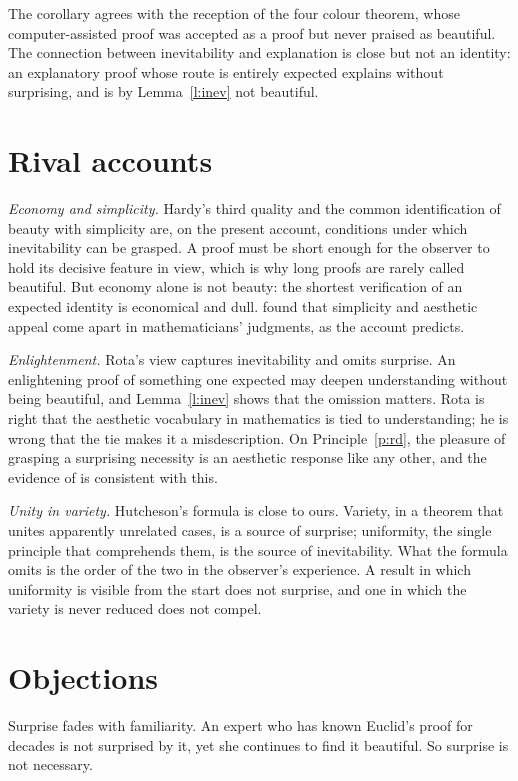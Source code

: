 \documentclass{situationist-preprint}
\begin{document}
The corollary agrees with the reception of the four colour theorem, whose computer-assisted proof was accepted as a proof but never praised as beautiful. The connection between inevitability and explanation is close but not an identity: an explanatory proof whose route is entirely expected explains without surprising, and is by Lemma~\ref{l:inev} not beautiful.

\section{Rival accounts}

\emph{Economy and simplicity.} Hardy's third quality and the common identification of beauty with simplicity are, on the present account, conditions under which inevitability can be grasped. A proof must be short enough for the observer to hold its decisive feature in view, which is why long proofs are rarely called beautiful. But economy alone is not beauty: the shortest verification of an expected identity is economical and dull. \citet{InglisAberdein2015} found that simplicity and aesthetic appeal come apart in mathematicians' judgments, as the account predicts.

\emph{Enlightenment.} Rota's view captures inevitability and omits surprise. An enlightening proof of something one expected may deepen understanding without being beautiful, and Lemma~\ref{l:inev} shows that the omission matters. Rota is right that the aesthetic vocabulary in mathematics is tied to understanding; he is wrong that the tie makes it a misdescription. On Principle~\ref{p:rd}, the pleasure of grasping a surprising necessity is an aesthetic response like any other, and the evidence of \citet{ZekiEtAl2014} is consistent with this.

\emph{Unity in variety.} Hutcheson's formula is close to ours. Variety, in a theorem that unites apparently unrelated cases, is a source of surprise; uniformity, the single principle that comprehends them, is the source of inevitability. What the formula omits is the order of the two in the observer's experience. A result in which uniformity is visible from the start does not surprise, and one in which the variety is never reduced does not compel.

\section{Objections}

\begin{objection}[Familiarity]
Surprise fades with familiarity. An expert who has known Euclid's proof for decades is not surprised by it, yet she continues to find it beautiful. So surprise is not necessary.
\end{objection}
\end{document}
